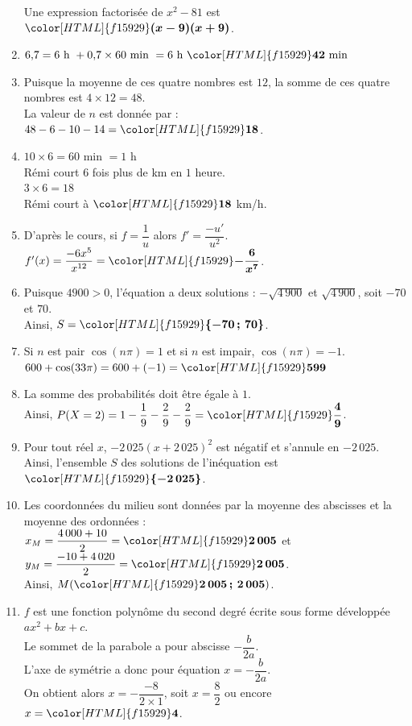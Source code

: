\documentclass[a4paper,11pt,landscape,exos]{nsi} %
\begin{document}
\begin{multicols}{2}
\begin{enumerate}[itemsep=1em]
    Une expression factorisée de $x^2-81$ est ${\color[HTML]{f15929}\boldsymbol{(x-9)(x+9)}}$.
\item $6{,}7 = 6 \text{ h } + 0{,}7\times 60 \text{ min } = 6 \text{ h }  {\color[HTML]{f15929}\boldsymbol{42}} \text{ min}$
\item Puisque la moyenne de ces quatre nombres est $12$, la somme de ces quatre nombres est $4\times 12=48$.\\
             La valeur de $n$ est donnée par :  $48-6-10-14={\color[HTML]{f15929}\boldsymbol{18}}$.
\item $10\times 6= 60$ min $=1$ h\\
    Rémi court $6$ fois plus de km en $1$ heure.\\
   $3\times 6=18$\\
   Rémi court à ${\color[HTML]{f15929}\boldsymbol{18}}$ km/h.
\item D'après le cours, si $f=\dfrac{1}{u}$ alors $f'=\dfrac{-u'}{u^2}$.\\
    $f'(x)=\dfrac{-6x^{5}}{x^{12}}={\color[HTML]{f15929}\boldsymbol{-\dfrac{6}{x^{7}}}}$.
\item Puisque $4900>0$, l'équation a deux solutions :  $-\sqrt{4\,900}$ et $\sqrt{4\,900}$, soit $-70$ et $70$.\\
    Ainsi, $S={\color[HTML]{f15929}\boldsymbol{\{-70\,;\,70\}}}$.
\item Si $n$ est pair $\cos(n\pi)=1$ et si $n$ est impair, $\cos(n\pi)=-1$.\\$600 + \cos(33\pi)=600 + (-1)={\color[HTML]{f15929}\boldsymbol{599}}$
\item  La somme des probabilités doit être égale à $1$.\\
    Ainsi, $P(X=2)=1-\dfrac{1}{9}-\dfrac{2}{9}-\dfrac{2}{9}={\color[HTML]{f15929}\boldsymbol{\dfrac{4}{9}}}$.
\item Pour tout réel $x$, $-2\,025(x+2\,025)^2$ est négatif et s'annule en $-2\,025$.\\
               Ainsi, l'ensemble $S$ des solutions de l'inéquation est  ${\color[HTML]{f15929}\boldsymbol{\{-2\,025\}}}$.
\item Les coordonnées du milieu sont données par la moyenne des abscisses et la moyenne des ordonnées : \\
         $x_M=\dfrac{4\,000+10}{2}={\color[HTML]{f15929}\boldsymbol{2\,005}}$ et $y_M=\dfrac{-10+4\,020}{2}={\color[HTML]{f15929}\boldsymbol{2\,005}}$.\\
         Ainsi,  $M({\color[HTML]{f15929}\boldsymbol{2\,005\,;\,2\,005}})$.
\item $f$ est une fonction polynôme du second degré écrite sous forme développée $ax^2+bx+c$.\\
       Le sommet de la parabole a pour abscisse $-\dfrac{b}{2a}$.\\
           L'axe de symétrie a donc pour équation $x=-\dfrac{b}{2a}$. \\
       On obtient alors  $x=-\dfrac{-8}{2\times 1}$, soit $x=\dfrac{8}{2}$ ou encore  $x={\color[HTML]{f15929}\boldsymbol{4}}$.
\end{enumerate}
\end{multicols}
\end{document}
